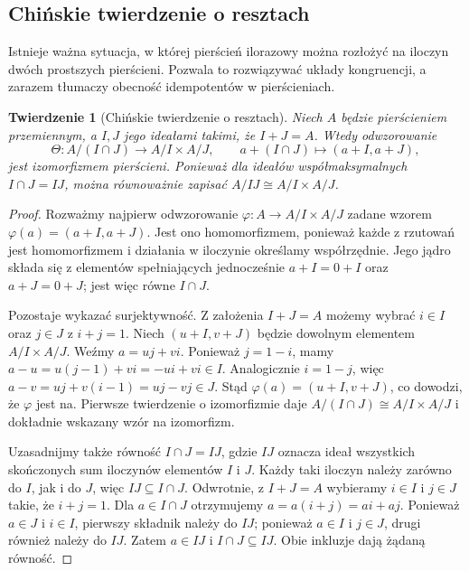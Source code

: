 \documentclass[11pt,a4paper,openany]{report}
\numberwithin{equation}{section}
\theoremstyle{plain}
\newtheorem{twierdzenie}{Twierdzenie}[section]
\theoremstyle{definition}
\theoremstyle{remark}
\begin{document}
\subsection{Chińskie twierdzenie o resztach}

Istnieje ważna sytuacja, w której pierścień ilorazowy można rozłożyć
na iloczyn dwóch prostszych pierścieni. Pozwala to rozwiązywać układy
kongruencji, a zarazem tłumaczy obecność idempotentów w pierścieniach.

\begin{twierdzenie}[Chińskie twierdzenie o resztach]
\label{tw:crt}
Niech $A$ będzie pierścieniem przemiennym, a $I,J$ jego ideałami
takimi, że $I+J=A$. Wtedy odwzorowanie
\[
 \Theta\colon A/(I\cap J)\longrightarrow A/I\times A/J,\qquad
 a+(I\cap J)\longmapsto(a+I,a+J),
\]
jest izomorfizmem pierścieni. Ponieważ dla ideałów współmaksymalnych
$I\cap J=IJ$, można równoważnie zapisać $A/IJ\cong A/I\times A/J$.
\end{twierdzenie}
\begin{proof}
Rozważmy najpierw odwzorowanie
$\varphi\colon A\to A/I\times A/J$ zadane wzorem
$\varphi(a)=(a+I,a+J)$. Jest ono homomorfizmem, ponieważ każde
z rzutowań jest homomorfizmem i działania w iloczynie określamy
współrzędnie. Jego jądro składa się z elementów spełniających
jednocześnie $a+I=0+I$ oraz $a+J=0+J$; jest więc równe $I\cap J$.

Pozostaje wykazać surjektywność. Z założenia $I+J=A$ możemy wybrać
$i\in I$ oraz $j\in J$ z $i+j=1$.
Niech $(u+I,v+J)$ będzie dowolnym elementem $A/I\times A/J$.
Weźmy $a=uj+vi$. Ponieważ $j=1-i$, mamy
$a-u=u(j-1)+vi=-ui+vi\in I$.
Analogicznie $i=1-j$, więc
$a-v=uj+v(i-1)=uj-vj\in J$.
Stąd $\varphi(a)=(u+I,v+J)$, co dowodzi, że $\varphi$ jest na.
Pierwsze twierdzenie o izomorfizmie daje
$A/(I\cap J)\cong A/I\times A/J$ i dokładnie wskazany wzór na izomorfizm.

Uzasadnijmy także równość $I\cap J=IJ$, gdzie $IJ$ oznacza
ideał wszystkich skończonych sum iloczynów elementów $I$ i $J$.
Każdy taki iloczyn należy zarówno do $I$, jak i do $J$,
więc $IJ\subseteq I\cap J$.
Odwrotnie, z $I+J=A$ wybieramy $i\in I$ i $j\in J$
takie, że $i+j=1$. Dla $a\in I\cap J$ otrzymujemy
$a=a(i+j)=ai+aj$. Ponieważ $a\in J$ i $i\in I$,
pierwszy składnik należy do $IJ$; ponieważ $a\in I$ i $j\in J$,
drugi również należy do $IJ$. Zatem $a\in IJ$ i
$I\cap J\subseteq IJ$. Obie inkluzje dają żądaną równość.
\end{proof}
\end{document}
